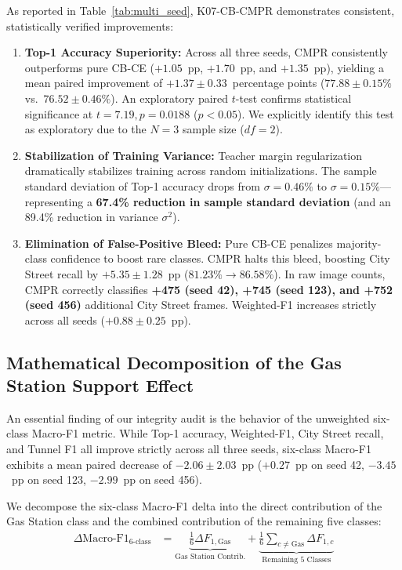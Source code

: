 \documentclass[conference]{IEEEtran}
\begin{document}
As reported in Table~\ref{tab:multi_seed}, K07-CB-CMPR demonstrates consistent, statistically verified improvements:
\begin{enumerate}
    \item \textbf{Top-1 Accuracy Superiority:} Across all three seeds, CMPR consistently outperforms pure CB-CE ($+1.05$~pp, $+1.70$~pp, and $+1.35$~pp), yielding a mean paired improvement of $\mathbf{+1.37 \pm 0.33}$~percentage points ($77.88 \pm 0.15\%$ vs.\ $76.52 \pm 0.46\%$). An exploratory paired $t$-test confirms statistical significance at $t = 7.19, p = 0.0188$ ($p < 0.05$). We explicitly identify this test as exploratory due to the $N=3$ sample size ($df=2$).
    \item \textbf{Stabilization of Training Variance:} Teacher margin regularization dramatically stabilizes training across random initializations. The sample standard deviation of Top-1 accuracy drops from $\sigma = 0.46\%$ to $\sigma = 0.15\%$---representing a \textbf{67.4\% reduction in sample standard deviation} (and an 89.4\% reduction in variance $\sigma^2$).
    \item \textbf{Elimination of False-Positive Bleed:} Pure CB-CE penalizes majority-class confidence to boost rare classes. CMPR halts this bleed, boosting City Street recall by $\mathbf{+5.35 \pm 1.28}$~pp ($81.23\% \to 86.58\%$). In raw image counts, CMPR correctly classifies \textbf{+475 (seed 42), +745 (seed 123), and +752 (seed 456)} additional City Street frames. Weighted-F1 increases strictly across all seeds ($+0.88 \pm 0.25$~pp).
\end{enumerate}

\subsection{Mathematical Decomposition of the Gas Station Support Effect}
An essential finding of our integrity audit is the behavior of the unweighted six-class Macro-F1 metric. While Top-1 accuracy, Weighted-F1, City Street recall, and Tunnel F1 all improve strictly across all three seeds, six-class Macro-F1 exhibits a mean paired decrease of $-2.06 \pm 2.03$~pp ($+0.27$~pp on seed 42, $-3.45$~pp on seed 123, $-2.99$~pp on seed 456).

We decompose the six-class Macro-F1 delta into the direct contribution of the Gas Station class and the combined contribution of the remaining five classes:
\begin{align}
\Delta \text{Macro-F1}_{\text{6-class}} &= \underbrace{\frac{1}{6}\Delta F_{1,\text{Gas}}}_{\text{Gas Station Contrib.}} + \underbrace{\frac{1}{6} \sum_{c \neq \text{Gas}} \Delta F_{1,c}}_{\text{Remaining 5 Classes}}
\end{align}
\end{document}
